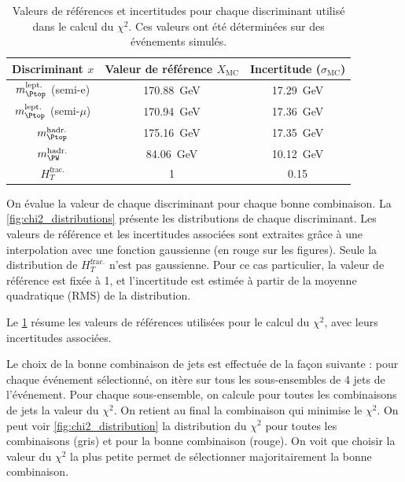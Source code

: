 \begin{table} \centering
    \begin{tabular}{@{}ccc@{}} \toprule
        Discriminant $x$& Valeur de référence $X_\text{MC}$ & Incertitude ($\sigma_\text{MC}$) \\ \midrule
        $m_{\Ptop}^{\text{lept.}}$ (semi-e) & \SI{170.88}{\GeV} & \SI{17.29}{\GeV} \\
        $m_{\Ptop}^{\text{lept.}}$ (semi-$\mu$) & \SI{170.94}{\GeV} & \SI{17.36}{\GeV} \\
        $m_{\Ptop}^{\text{hadr.}}$ & \SI{175.16}{\GeV} & \SI{17.35}{\GeV} \\
        $m_{\PW}^{\text{hadr.}}$ & \SI{84.06}{\GeV} & \SI{10.12}{\GeV} \\
        $H_{T}^{\text{frac.}}$ & \num{1} & \num{0.15} \\ \bottomrule
    \end{tabular}
    \caption{Valeurs de références et incertitudes pour chaque discriminant utilisé dans le calcul du $\chi^2$. Ces valeurs ont été déterminées sur des événements \ttbar simulés.}
    \label{tab:chi2_ref_values}
\end{table}

On évalue la valeur de chaque discriminant pour chaque bonne combinaison. La \cref{fig:chi2_distributions} présente les distributions de chaque discriminant. Les valeurs de référence et les incertitudes associées sont extraites grâce à une interpolation avec une fonction gaussienne (en rouge sur les figures). Seule la distribution de $H_T^\text{frac.}$ n'est pas gaussienne. Pour ce cas particulier, la valeur de référence est fixée à 1, et l'incertitude est estimée à partir de la moyenne quadratique (RMS) de la distribution.

Le \cref{tab:chi2_ref_values} résume les valeurs de références utilisées pour le calcul du $\chi^2$, avec leurs incertitudes associées.

\bigskip

Le choix de la bonne combinaison de jets est effectuée de la façon suivante : pour chaque événement sélectionné, on itère sur tous les sous-ensembles de 4 jets de l'événement. Pour chaque sous-ensemble, on calcule pour toutes les combinaisons de jets la valeur du $\chi^2$. On retient au final la combinaison qui minimise le $\chi^2$. On peut voir \cref{fig:chi2_distribution} la distribution du $\chi^2$ pour toutes les combinaisons (gris) et pour la bonne combinaison (rouge). On voit que choisir la valeur du $\chi^2$ la plus petite permet de sélectionner majoritairement la bonne combinaison.

